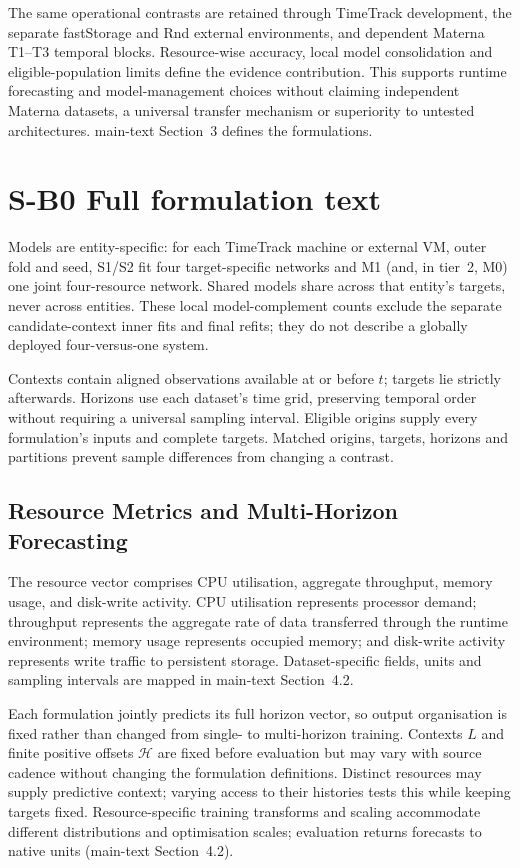 \documentclass[a4paper,11pt]{article}
\begin{document}
The same operational contrasts are retained through TimeTrack development,
the separate fastStorage and Rnd external environments, and dependent Materna
T1--T3 temporal blocks. Resource-wise accuracy, local model consolidation and
eligible-population limits define the evidence contribution. This supports
runtime forecasting and model-management choices without claiming independent
Materna datasets, a universal transfer mechanism or superiority to untested
architectures. main-text Section~3 defines the formulations.

\clearpage
\section*{S-B0 Full formulation text}
Models are entity-specific: for each TimeTrack machine or external VM,
outer fold and seed, S1/S2 fit four target-specific networks and M1 (and,
in tier~2, M0) one joint four-resource network. Shared models share across
that entity's targets, never across entities. These local model-complement counts exclude the separate
candidate-context inner fits and final refits; they do not describe a
globally deployed four-versus-one system.

Contexts contain aligned observations available at or before $t$; targets lie
strictly afterwards. Horizons use each dataset's time grid, preserving temporal
order without requiring a universal sampling interval. Eligible origins supply
every formulation's inputs and complete targets. Matched origins, targets,
horizons and partitions prevent sample differences from changing a contrast.

\subsection*{Resource Metrics and Multi-Horizon Forecasting}


The resource vector comprises CPU utilisation, aggregate throughput, memory
usage, and disk-write activity. CPU utilisation represents processor demand;
throughput represents the aggregate rate of data transferred through the
runtime environment; memory usage represents occupied memory; and disk-write
activity represents write traffic to persistent storage. Dataset-specific
fields, units and sampling intervals are mapped in main-text Section~4.2.

Each formulation jointly predicts its full horizon vector, so output
organisation is fixed rather than changed from single- to multi-horizon
training. Contexts $L$ and finite positive offsets $\mathcal{H}$ are fixed
before evaluation but may vary with source cadence without changing the
formulation definitions. Distinct resources may supply predictive context;
varying access to their histories tests this while keeping targets fixed.
Resource-specific training transforms and scaling accommodate different
distributions and optimisation scales; evaluation returns forecasts to native
units (main-text Section~4.2).
\end{document}
